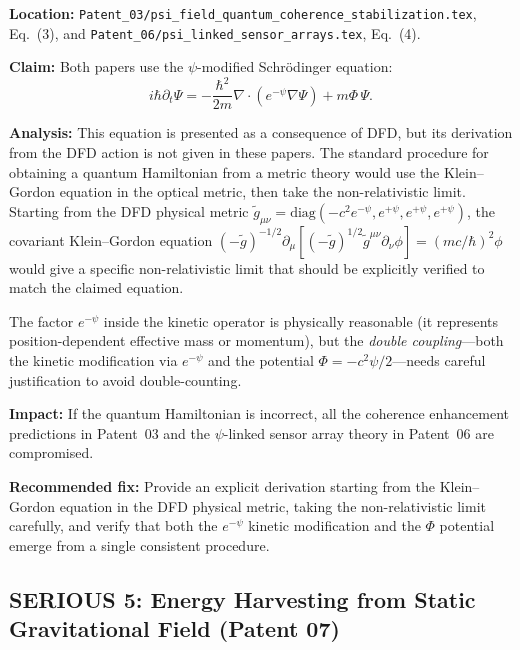 \documentclass[12pt,a4paper]{article}
\begin{document}
\begin{serious}
\textbf{Location:} \texttt{Patent\_03/psi\_field\_quantum\_coherence\_stabilization.tex},
Eq.~(3), and \texttt{Patent\_06/psi\_linked\_sensor\_arrays.tex}, Eq.~(4).

\medskip
\textbf{Claim:} Both papers use the $\psi$-modified Schr\"{o}dinger equation:
\[
i\hbar\partial_t\Psi = -\frac{\hbar^2}{2m}\nabla\cdot(e^{-\psi}\nabla\Psi) + m\Phi\,\Psi.
\]

\medskip
\textbf{Analysis:} This equation is presented as a consequence of DFD, but
its derivation from the DFD action is not given in these papers. The standard
procedure for obtaining a quantum Hamiltonian from a metric theory would use
the Klein--Gordon equation in the optical metric, then take the
non-relativistic limit. Starting from the DFD physical metric
$\tilde{g}_{\mu\nu} = \text{diag}(-c^2 e^{-\psi}, e^{+\psi}, e^{+\psi}, e^{+\psi})$,
the covariant Klein--Gordon equation
$(-\tilde{g})^{-1/2}\partial_\mu[(-\tilde{g})^{1/2}\tilde{g}^{\mu\nu}\partial_\nu\phi] = (mc/\hbar)^2\phi$
would give a specific non-relativistic limit that should be explicitly
verified to match the claimed equation.

The factor $e^{-\psi}$ inside the kinetic operator is physically
reasonable (it represents position-dependent effective mass or momentum),
but the \textit{double coupling}---both the kinetic modification via
$e^{-\psi}$ and the potential $\Phi = -c^2\psi/2$---needs careful
justification to avoid double-counting.

\medskip
\textbf{Impact:} If the quantum Hamiltonian is incorrect, all the coherence
enhancement predictions in Patent~03 and the $\psi$-linked sensor array
theory in Patent~06 are compromised.

\medskip
\textbf{Recommended fix:} Provide an explicit derivation starting from the
Klein--Gordon equation in the DFD physical metric, taking the
non-relativistic limit carefully, and verify that both the $e^{-\psi}$
kinetic modification and the $\Phi$ potential emerge from a single
consistent procedure.
\end{serious}

\subsection{SERIOUS 5: Energy Harvesting from Static Gravitational Field (Patent 07)}
\label{sec:ser5}
\end{document}
